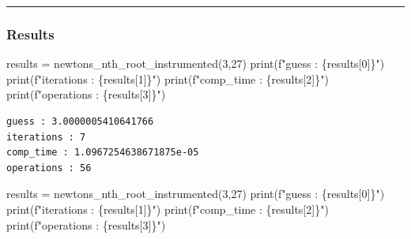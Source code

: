 \documentclass[
  letterpaper,
  DIV=11,
  numbers=noendperiod]{scrartcl}
\newenvironment{Shaded}{\begin{snugshade}}{\end{snugshade}}
\newcommand{\BuiltInTok}[1]{\textcolor[rgb]{0.00,0.23,0.31}{#1}}
\newcommand{\DecValTok}[1]{\textcolor[rgb]{0.68,0.00,0.00}{#1}}
\newcommand{\NormalTok}[1]{\textcolor[rgb]{0.00,0.23,0.31}{#1}}
\newcommand{\OperatorTok}[1]{\textcolor[rgb]{0.37,0.37,0.37}{#1}}
\newcommand{\SpecialCharTok}[1]{\textcolor[rgb]{0.37,0.37,0.37}{#1}}
\newcommand{\SpecialStringTok}[1]{\textcolor[rgb]{0.13,0.47,0.30}{#1}}
\begin{document}
\begin{center}\rule{0.5\linewidth}{0.5pt}\end{center}

\subsubsection{Results}\label{results}

\begin{Shaded}
\begin{Highlighting}[]
\NormalTok{results }\OperatorTok{=}\NormalTok{ newtons\_nth\_root\_instrumented(}\DecValTok{3}\NormalTok{,}\DecValTok{27}\NormalTok{)}
\BuiltInTok{print}\NormalTok{(}\SpecialStringTok{f"guess : }\SpecialCharTok{\{}\NormalTok{results[}\DecValTok{0}\NormalTok{]}\SpecialCharTok{\}}\SpecialStringTok{"}\NormalTok{)}
\BuiltInTok{print}\NormalTok{(}\SpecialStringTok{f"iterations : }\SpecialCharTok{\{}\NormalTok{results[}\DecValTok{1}\NormalTok{]}\SpecialCharTok{\}}\SpecialStringTok{"}\NormalTok{)}
\BuiltInTok{print}\NormalTok{(}\SpecialStringTok{f"comp\_time : }\SpecialCharTok{\{}\NormalTok{results[}\DecValTok{2}\NormalTok{]}\SpecialCharTok{\}}\SpecialStringTok{"}\NormalTok{)}
\BuiltInTok{print}\NormalTok{(}\SpecialStringTok{f"operations : }\SpecialCharTok{\{}\NormalTok{results[}\DecValTok{3}\NormalTok{]}\SpecialCharTok{\}}\SpecialStringTok{"}\NormalTok{)}
\end{Highlighting}
\end{Shaded}

\begin{verbatim}
guess : 3.0000005410641766
iterations : 7
comp_time : 1.0967254638671875e-05
operations : 56
\end{verbatim}

\begin{Shaded}
\begin{Highlighting}[]
\NormalTok{results }\OperatorTok{=}\NormalTok{ newtons\_nth\_root\_instrumented(}\DecValTok{3}\NormalTok{,}\DecValTok{27}\NormalTok{)}
\BuiltInTok{print}\NormalTok{(}\SpecialStringTok{f"guess : }\SpecialCharTok{\{}\NormalTok{results[}\DecValTok{0}\NormalTok{]}\SpecialCharTok{\}}\SpecialStringTok{"}\NormalTok{)}
\BuiltInTok{print}\NormalTok{(}\SpecialStringTok{f"iterations : }\SpecialCharTok{\{}\NormalTok{results[}\DecValTok{1}\NormalTok{]}\SpecialCharTok{\}}\SpecialStringTok{"}\NormalTok{)}
\BuiltInTok{print}\NormalTok{(}\SpecialStringTok{f"comp\_time : }\SpecialCharTok{\{}\NormalTok{results[}\DecValTok{2}\NormalTok{]}\SpecialCharTok{\}}\SpecialStringTok{"}\NormalTok{)}
\BuiltInTok{print}\NormalTok{(}\SpecialStringTok{f"operations : }\SpecialCharTok{\{}\NormalTok{results[}\DecValTok{3}\NormalTok{]}\SpecialCharTok{\}}\SpecialStringTok{"}\NormalTok{)}
\end{Highlighting}
\end{Shaded}
\end{document}

